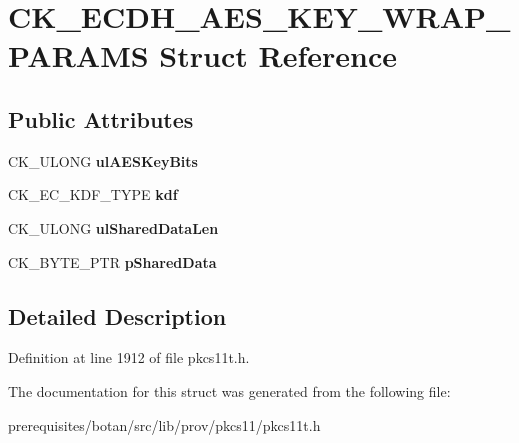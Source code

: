 \hypertarget{struct_c_k___e_c_d_h___a_e_s___k_e_y___w_r_a_p___p_a_r_a_m_s}{}\section{C\+K\+\_\+\+E\+C\+D\+H\+\_\+\+A\+E\+S\+\_\+\+K\+E\+Y\+\_\+\+W\+R\+A\+P\+\_\+\+P\+A\+R\+A\+MS Struct Reference}
\label{struct_c_k___e_c_d_h___a_e_s___k_e_y___w_r_a_p___p_a_r_a_m_s}
\subsection*{Public Attributes}
\begin{DoxyCompactItemize}
\item 
\mbox{\label{struct_c_k___e_c_d_h___a_e_s___k_e_y___w_r_a_p___p_a_r_a_m_s_a95adba11a5558c7f0d7deb80363a373c}} 
C\+K\+\_\+\+U\+L\+O\+NG {\bfseries ul\+A\+E\+S\+Key\+Bits}
\item 
\mbox{\label{struct_c_k___e_c_d_h___a_e_s___k_e_y___w_r_a_p___p_a_r_a_m_s_a8d1902a1141a3e568f6017c6d0f1e570}} 
C\+K\+\_\+\+E\+C\+\_\+\+K\+D\+F\+\_\+\+T\+Y\+PE {\bfseries kdf}
\item 
\mbox{\label{struct_c_k___e_c_d_h___a_e_s___k_e_y___w_r_a_p___p_a_r_a_m_s_a4a13e113ad71c856ad582394640706f5}} 
C\+K\+\_\+\+U\+L\+O\+NG {\bfseries ul\+Shared\+Data\+Len}
\item 
\mbox{\label{struct_c_k___e_c_d_h___a_e_s___k_e_y___w_r_a_p___p_a_r_a_m_s_a2a79450a00f91d8242cba97af3613b4c}} 
C\+K\+\_\+\+B\+Y\+T\+E\+\_\+\+P\+TR {\bfseries p\+Shared\+Data}
\end{DoxyCompactItemize}


\subsection{Detailed Description}


Definition at line 1912 of file pkcs11t.\+h.



The documentation for this struct was generated from the following file\+:\begin{DoxyCompactItemize}
\item 
prerequisites/botan/src/lib/prov/pkcs11/pkcs11t.\+h\end{DoxyCompactItemize}
